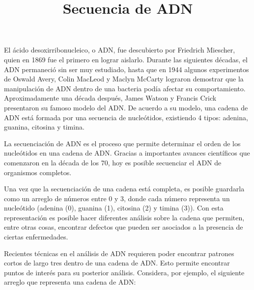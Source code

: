 \documentclass{oci}
\title{Secuencia de ADN}
\begin{document}
\begin{problemDescription}
  El ácido desoxirribonucleico, o ADN, fue descubierto por Friedrich Miescher,
  quien en 1869 fue el primero en lograr aislarlo.
  Durante las siguientes décadas, el ADN permaneció sin ser muy estudiado, hasta que
  en 1944 algunos experimentos de Oswald Avery, Colin MacLeod y Maclyn McCarty lograron
  demostrar que la manipulación de ADN dentro de una bacteria podía afectar su comportamiento.
  Aproximadamente una década después, James Watson y Francis Crick presentaron
  su famoso modelo del ADN.
  De acuerdo a su modelo, una cadena de ADN está formada por una secuencia
  de nucleótidos, existiendo 4 tipos: adenina, guanina, citosina y timina.

  La secuenciación de ADN es el proceso que permite determinar el orden de los
  nucleótidos en una cadena de ADN.
  Gracias a importantes avances científicos que comenzaron en la década de los 70, hoy
  es posible secuenciar el ADN de organismos completos.

  Una vez que la secuenciación de una cadena está completa, es posible 
  guardarla como un arreglo de números entre 0 y 3, donde cada número
  representa un nucleótido (adenina (0), guanina (1), citosina (2) y timina (3)).
  Con esta representación es posible hacer diferentes análisis sobre la cadena que
  permiten, entre otras cosas, encontrar defectos que pueden ser asociados a la
  presencia de ciertas enfermedades.

  Recientes técnicas en el análisis de ADN requieren poder encontrar patrones
  cortos de largo tres dentro de una cadena de ADN.
  Esto permite encontrar puntos de interés para su posterior análisis.
  Considera, por ejemplo, el siguiente arreglo que representa una cadena de ADN:

  \begin{center}
  \end{center}


\end{problemDescription}
\end{document}
